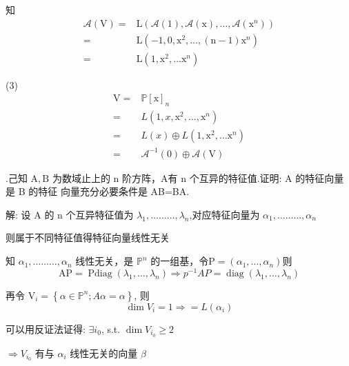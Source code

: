 \documentclass{article}
\begin{document}
知
$$
    \begin{aligned}
        \mathcal{A}(\mathrm{V})= & \mathrm{L}\left(\mathcal{A}(1), \mathcal{A}(\mathrm{x}), \ldots, \mathcal{A}\left(\mathrm{x}^{n}\right)\right) \\
        =                        & \mathrm{L}\left(-1,0, \mathrm{x}^{2}, \ldots,(\mathrm{n}-1) \mathrm{x}^{n}\right)                              \\
        =                        & \mathrm{L}\left(1, \mathrm{x}^{2}, \ldots \mathrm{x}^{n}\right)
    \end{aligned}
$$                                                  

(3)
$$
    \begin{aligned}
        \mathrm{V}= & \mathbb{P}[\mathrm{x}]_{n}                                         \\
        =           & L\left(1, x, \mathrm{x}^{2}, \ldots, \mathrm{x}^{n}\right)         \\
        =           & L(x) \oplus L\left(1, \mathrm{x}^{2}, \ldots \mathrm{x}^{n}\right) \\
        =           & \mathcal{A}^{-1}(0) \oplus \mathcal{A}(\mathrm{V})
    \end{aligned}
$$

\vspace{1ex}
{.}己知 $\mathrm{A}, \mathrm{B}$ 为数域止上的 $\mathrm{n}$ 阶方阵，A有 $\mathrm{n}$ 个互异的特征值.证明: $\mathrm{A}$ 的特征向量是 B 的特征 向量充分必要条件是 AB=BA.

解:
设 A 的 $\mathrm{n}$ 个互异特征值为 $\lambda_{1}, \ldots \ldots \ldots, \lambda_{n}$,对应特征向量为 $\alpha_{1}, \ldots \ldots \ldots, \alpha_{n}$ 

则属于不同特征值得特征向量线性无关

知 $\alpha_{1}, \ldots \ldots \ldots, \alpha_{n}$ 线性无关，是 $\mathbb{P}^{n}$ 的一组基，令$\mathrm{P}=\left(\alpha_{1}, \ldots, \alpha_{n}\right)$则 
$$\mathrm{AP}=\operatorname{Pdiag}\left(\lambda_{1}, \ldots, \lambda_{n}\right) \Rightarrow p^{-1} A P=\operatorname{diag}\left(\lambda_{1}, \ldots, \lambda_{n}\right)$$

再令 $\mathrm{V}_{i}=\left\{\alpha \in \mathbb{P}^{n} ; A \alpha=\alpha\right\}$, 则
$$\operatorname{dim} V_{i}=1 \Rightarrow=L\left(\alpha_{i}\right)$$

可以用反证法证得: $\exists i_{0}$, s.t. $\operatorname{dim} V_{i_{0}} \geq 2$

$\Rightarrow V_{i_{0}}$ 有与 $\alpha_{i}$ 线性无关的向量 $\beta$
\end{document}

